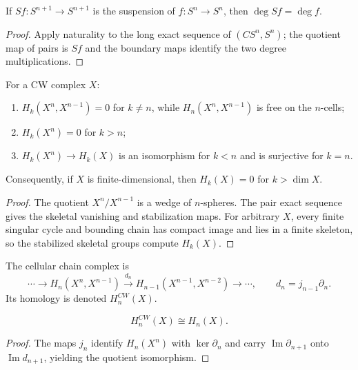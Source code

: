 \begin{proposition}
\label{prop:homology-cw-complexes}

If $Sf:S^{n+1}\to S^{n+1}$ is the suspension of $f:S^n\to S^n$, then $\deg Sf=\deg f$.
\end{proposition}
\begin{proof}
\sketch Apply naturality to the long exact sequence of $(CS^n,S^n)$; the quotient map of pairs is $Sf$ and the boundary maps identify the two degree multiplications.
\end{proof}

\begin{lemma}
\label{lem:homology-cw-skeleton-pairs}

For a CW complex $X$:
\begin{enumerate}
\item $H_k(X^n,X^{n-1})=0$ for $k\ne n$, while $H_n(X^n,X^{n-1})$ is free on the $n$-cells;
\item $H_k(X^n)=0$ for $k>n$;
\item $H_k(X^n)\to H_k(X)$ is an isomorphism for $k<n$ and is surjective for $k=n$.
\end{enumerate}
Consequently, if $X$ is finite-dimensional, then $H_k(X)=0$ for
$k>\dim X$.
\end{lemma}
\begin{proof}
\sketch The quotient $X^n/X^{n-1}$ is a wedge of $n$-spheres. The pair exact
sequence gives the skeletal vanishing and stabilization maps. For arbitrary
$X$, every finite singular cycle and bounding chain has compact image and lies
in a finite skeleton, so the stabilized skeletal groups compute $H_k(X)$.
\end{proof}

The cellular chain complex is
\[
\cdots\to H_n(X^n,X^{n-1})\xrightarrow{d_n}H_{n-1}(X^{n-1},X^{n-2})\to\cdots,
\qquad d_n=j_{n-1}\partial_n.
\]
Its homology is denoted $H_n^{CW}(X)$.

\begin{theorem}
\label{thm:cellular-singular-homology-isomorphic}

\[
H_n^{CW}(X)\cong H_n(X).
\]
\end{theorem}
\begin{proof}
\sketch The maps $j_n$ identify $H_n(X^n)$ with $\ker\partial_n$ and carry $\operatorname{Im}\partial_{n+1}$ onto $\operatorname{Im}d_{n+1}$, yielding the quotient isomorphism.
\end{proof}

